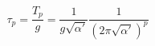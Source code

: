 \begin{equation}
\tau_p =\frac{T_p}{g} =
 \frac{1}{g\sqrt{\alpha'}}  \frac{1}{ (2 \pi \sqrt{\alpha'})^{p}} 
\end{equation}


